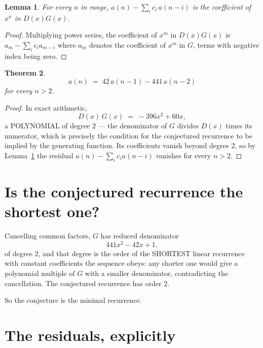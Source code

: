 \documentclass[11pt,a4paper]{article}
\theoremstyle{plain}
\newtheorem{theorem}{Theorem}
\newtheorem{lemma}[theorem]{Lemma}
\theoremstyle{definition}
\begin{document}
\begin{lemma}\label{lem:key}
For every $n$ in range, $a(n)-\sum_i c_i\,a(n-i)$ is the coefficient of $x^{n}$ in
$D(x)G(x)$.
\end{lemma}

\begin{proof}
Multiplying power series, the coefficient of $x^{m}$ in $D(x)G(x)$ is
$a_m-\sum_i c_i a_{m-i}$ where $a_m$ denotes the coefficient of $x^{m}$ in $G$, terms with
negative index being zero.
\end{proof}

\begin{theorem}
\[
a(n)\;=\;42\,a(n-1) - 441\,a(n-2)
\]
for every $n>2$.
\end{theorem}

\begin{proof}
In exact arithmetic,
\[
D(x)\,G(x)\;=\;- 396 x^{2} + 60 x,
\]
a POLYNOMIAL of degree $2$ --- the denominator of $G$ divides $D(x)$ times its numerator,
which is precisely the condition for the conjectured recurrence to be implied by the
generating function. Its coefficients vanish beyond degree $2$, so by
Lemma~\ref{lem:key} the residual $a(n)-\sum_ic_ia(n-i)$ vanishes for every
$n>2$.
\end{proof}

\section{Is the conjectured recurrence the shortest one?}

Cancelling common factors, $G$ has reduced denominator
\[
441 x^{2} - 42 x + 1,
\]
of degree $2$, and that degree is the order of the SHORTEST linear recurrence with
constant coefficients the sequence obeys: any shorter one would give a polynomial multiple of
$G$ with a smaller denominator, contradicting the cancellation. The conjectured recurrence has
order $2$.

So the conjecture is the minimal recurrence.

\section{The residuals, explicitly}
\end{document}
